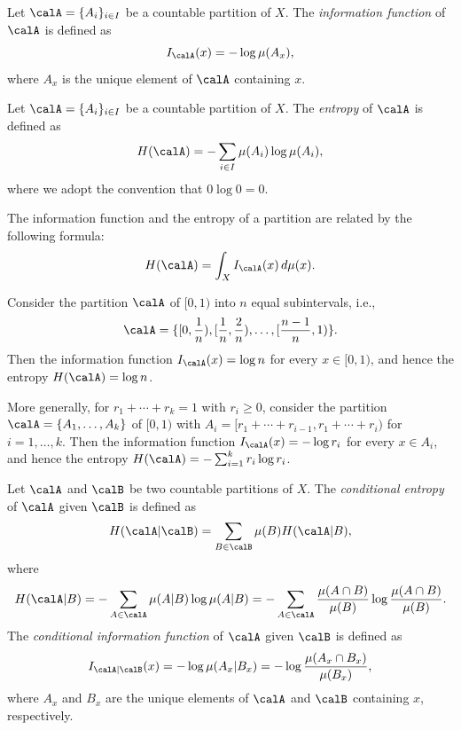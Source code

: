   \begin{definition}
    Let $\calA = \{A_i\}_{i \in I}$ be a countable partition of $X$. The \emph{information function} of $\calA$ is defined as
    \[
    I_\calA(x) = -\log \mu(A_x),
    \]
    where $A_x$ is the unique element of $\calA$ containing $x$.
  \end{definition}


  \begin{definition}
    Let $\calA = \{A_i\}_{i \in I}$ be a countable partition of $X$. The \emph{entropy} of $\calA$ is defined as
    \[
    H(\calA) = -\sum_{i \in I} \mu(A_i) \log \mu(A_i),
    \]
    where we adopt the convention that $0 \log 0 = 0$.
  \end{definition}

  The information function and the entropy of a partition are related by the following formula:
  \[ H(\calA) = \int_X I_\calA(x) \, d\mu(x). \]

  \begin{example}
    Consider the partition $\calA$ of $[0,1)$ into $n$ equal subintervals, i.e., 
    \[ \calA = \{[0, \frac{1}{n}), [\frac{1}{n}, \frac{2}{n}), \ldots, [\frac{n-1}{n}, 1)\}. \]
    Then the information function $I_{\calA}(x) = \log n$ for every $x \in [0,1)$, and hence the entropy $H(\calA) = \log n$.

    More generally, for $r_1+\cdots + r_k = 1$ with $r_i \geq 0$, consider the partition $\calA = \{A_1, \ldots, A_k\}$ of $[0,1)$ with $A_i = [r_1 + \cdots + r_{i-1}, r_1 + \cdots + r_i)$ for $i=1, \ldots, k$. 
    Then the information function $I_{\calA}(x) = -\log r_i$ for every $x \in A_i$, and hence the entropy $H(\calA) = -\sum_{i=1}^k r_i \log r_i$.
  \end{example}

  \begin{definition}
    Let $\calA$ and $\calB$ be two countable partitions of $X$. 
    The \emph{conditional entropy} of $\calA$ given $\calB$ is defined as
    \[
      H(\calA | \calB) = \sum_{B \in \calB} \mu(B) H(\calA | B),
    \]
    where
    \[
      H(\calA | B) = -\sum_{A \in \calA} \mu(A|B) \log \mu(A|B) = -\sum_{A \in \calA} \frac{\mu(A \cap B)}{\mu(B)} \log \frac{\mu(A \cap B)}{\mu(B)}.
    \]
    The \emph{conditional information function} of $\calA$ given $\calB$ is defined as
    \[
      I_{\calA | \calB}(x) = -\log \mu(A_x | B_x) =  -\log \frac{\mu(A_x \cap B_x)}{\mu(B_x)},
    \]
    where $A_x$ and $B_x$ are the unique elements of $\calA$ and $\calB$ containing $x$, respectively.
  \end{definition}

